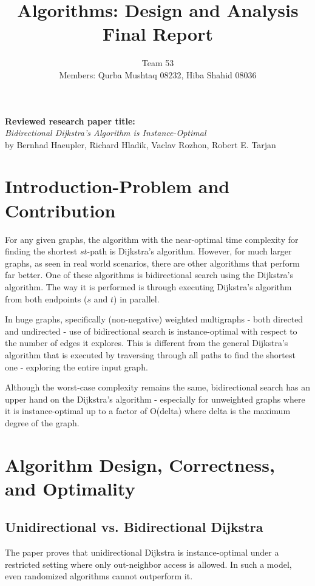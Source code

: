 \documentclass[12pt]{article}
\title{Algorithms: Design and Analysis \\ Final Report}
\author{
  Team 53 \\
  Members: Qurba Mushtaq 08232, Hiba Shahid 08036
}
\date{}
\begin{document}
\maketitle

\noindent\textbf{Reviewed research paper title:} \\
\textit{Bidirectional Dijkstra's Algorithm is Instance-Optimal} \\
by Bernhad Haeupler, Richard Hladik, Vaclav Rozhon, Robert E. Tarjan


\section{Introduction-Problem and Contribution}
For any given graphs, the algorithm with the near-optimal time complexity for finding the shortest $st$-path is Dijkstra's algorithm. However, for much larger graphs, as seen in real world scenarios, there are other algorithms that perform far better. One of these algorithms is bidirectional search using the Dijkstra's algorithm. The way it is performed is through executing Dijkstra's algorithm from both endpoints ($s$ and $t$) in parallel. 

In huge graphs, specifically (non-negative) weighted multigraphs - both directed and undirected - use of bidirectional search is instance-optimal with respect to the number of edges it explores. This is different from the general Dijkstra's algorithm that is executed by traversing through all paths to find the shortest one - exploring the entire input graph. 

Although the worst-case complexity remains the same, bidirectional search has an upper hand on the Dijkstra's algorithm - especially for unweighted graphs where it is instance-optimal up to a factor of O(delta) where delta is the maximum degree of the graph.


\section{Algorithm Design, Correctness, and Optimality}

\subsection{Unidirectional vs. Bidirectional Dijkstra}
The paper proves that unidirectional Dijkstra is instance-optimal under a restricted setting where only out-neighbor access is allowed. In such a model, even randomized algorithms cannot outperform it.
\end{document}
